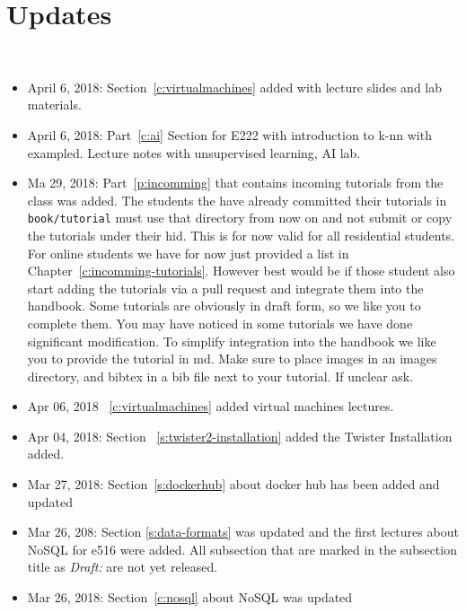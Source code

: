 
\chapter{Updates}
\FILENAME\


\begin{itemize}
\item April 6, 2018: Section~\ref{c:virtualmachines} added with lecture slides and lab materials.

\item April 6, 2018: Part~\ref{c:ai} Section for E222 with
  introduction to k-nn with exampled. Lecture notes with unsupervised
  learning, AI lab.

\item Ma 29, 2018: Part~\ref{p:incomming} that contains incoming
  tutorials from the class was added. The students the have already
  committed their tutorials in \verb|book/tutorial| must use that
  directory from now on and not submit or copy the tutorials under
  their hid. This is for now valid for all residential students.  For
  online students we have for now just provided a list in
  Chapter~\ref{c:incomming-tutorials}. However best would be if those
  student also start adding the tutorials via a pull request and
  integrate them into the handbook. Some tutorials are obviously in
  draft form, so we like you to complete them. You may have noticed in
  some tutorials we have done significant modification. To simplify
  integration into the handbook we like you to provide the tutorial in
  md. Make sure to place images in an images directory, and bibtex in
  a bib file next to your tutorial. If unclear ask.

\item Apr 06, 2018 ~\ref{c:virtualmachines} added virtual machines lectures.

\item Apr 04, 2018: Section ~\ref{s:twister2-installation} added the Twister Installation added.

\item Mar 27, 2018: Section~\ref{s:dockerhub} about docker hub has
  been added and updated

\item Mar 26, 208: Section \ref{s:data-formats} was updated and the
  first lectures about NoSQL for e516 were added. All subsection that
  are marked in the subsection title as \emph{Draft:} are not yet released.

\item Mar 26, 2018: Section~\ref{c:nosql} about NoSQL was updated


\end{itemize}
